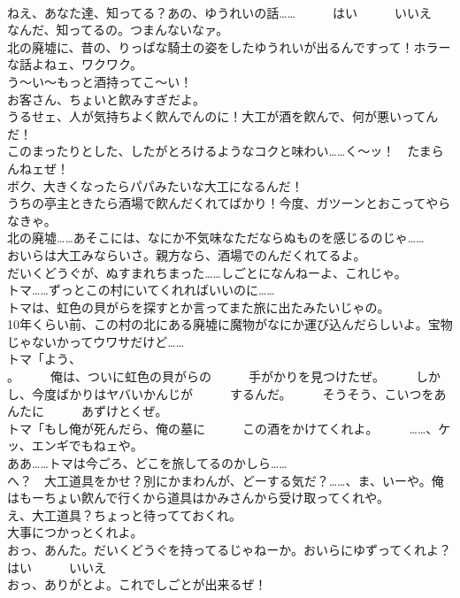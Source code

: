\documentclass[8pt]{extreport}
\begin{document}
\begin{CJK}{UTF8}{min}
\\	ねえ、あなた達、知ってる？あの、ゆうれいの話……　　　はい　　　いいえ	
\\	なんだ、知ってるの。つまんないなァ。	
\\	北の廃墟に、昔の、りっぱな騎土の姿をしたゆうれいが出るんですって！ホラーな話よねェ、ワクワク。	
\\	う～い～もっと酒持ってこ～い！	
\\	お客さん、ちょいと飮みすぎだよ。	
\\	うるせェ、人が気持ちよく飮んでんのに！大工が酒を飮んで、何が悪いってんだ！	
\\	このまったりとした、したがとろけるようなコクと味わい……く～ッ！　たまらんねェぜ！	
\\	ボク、大きくなったらパパみたいな大工になるんだ！ 
\\	うちの亭主ときたら酒場で飮んだくれてばかり！今度、ガツーンとおこってやらなきゃ。	
\\	北の廃墟……あそこには、なにか不気味なただならぬものを感じるのじゃ……	
\\	おいらは大工みならいさ。親方なら、酒場でのんだくれてるよ。	
\\	だいくどうぐが、ぬすまれちまった……しごとになんねーよ、これじゃ。	
\\	トマ……ずっとこの村にいてくれればいいのに……	
\\	トマは、虹色の貝がらを探すとか言ってまた旅に出たみたいじゃの。	
\\	10年くらい前、この村の北にある廃墟に魔物がなにか運び込んだらしいよ。宝物じゃないかってウワサだけど……	
\\	トマ「よう、
\\	。　　　俺は、ついに虹色の貝がらの　　　手がかりを見つけたぜ。　　　しかし、今度ばかりはヤバいかんじが　　　するんだ。　　　そうそう、こいつをあんたに　　　あずけとくぜ。	
\\	トマ「もし俺が死んだら、俺の墓に　　　この酒をかけてくれよ。　　　……、ケッ、エンギでもねェや。	
\\	ああ……トマは今ごろ、どこを旅してるのかしら……	
\\	へ？　大工道具をかせ？別にかまわんが、どーする気だ？……、ま、いーや。俺はもーちょい飮んで行くから道具はかみさんから受け取ってくれや。	
\\	え、大工道具？ちょっと待ってておくれ。	
\\	大事につかっとくれよ。	
\\	おっ、あんた。だいくどうぐを持ってるじゃねーか。おいらにゆずってくれよ？　　　はい　　　いいえ	
\\	おっ、ありがとよ。これでしごとが出来るぜ！	

\end{CJK}
\end{document}
